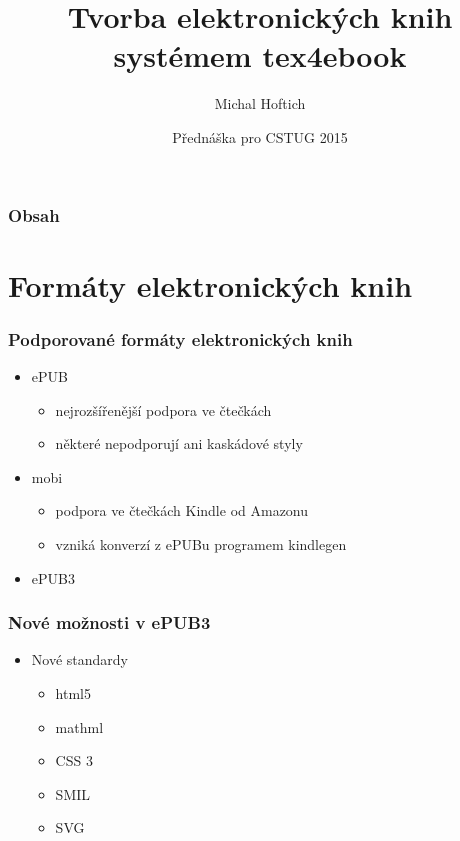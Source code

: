 \documentclass[czech]{beamer}
\title{Tvorba elektronických knih systémem tex4ebook}
\author{Michal Hoftich\inst{1}}
\institute{
  \inst{1}
  <\url{michal.h21@gmail.com}>\\
  Ústřední knihovna PedF UK
}
\date{Přednáška pro CSTUG 2015}
\begin{document}
\frame{\titlepage}

\begin{frame}
  \frametitle{Obsah}
  \tableofcontents
\end{frame}

\section{Formáty elektronických knih}
\begin{frame}
\frametitle{Podporované formáty elektronických knih}
  \begin{itemize}%
\item ePUB 
  \begin{itemize}
    \item nejrozšířenější podpora ve čtečkách
    \item některé nepodporují ani kaskádové styly
  \end{itemize}
\item mobi
  \begin{itemize}
    \item podpora ve čtečkách Kindle od Amazonu
    \item vzniká konverzí z ePUBu programem kindlegen
  \end{itemize}
\item ePUB3
\end{itemize}
\end{frame}
\begin{frame}
  \frametitle{Nové možnosti v ePUB3}
  \begin{itemize}%
    \item Nové standardy
      \begin{itemize}
    \item  html5
    \item  mathml
    \item  CSS 3
    \item  SMIL
    \item  SVG
  \end{itemize}
  \end{itemize}
\end{frame}
\end{document}
